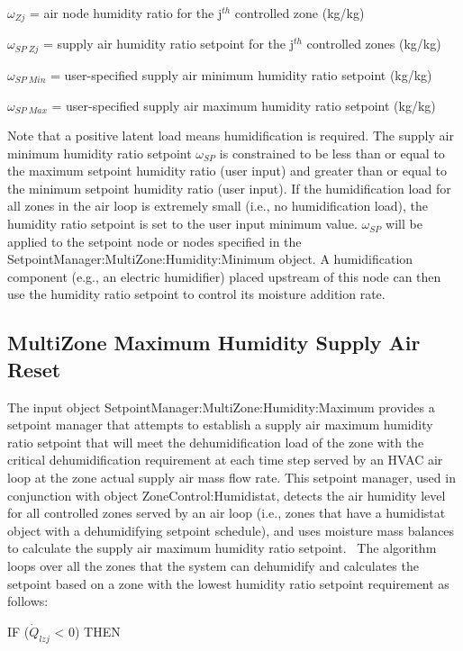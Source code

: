 \({\omega_{Zj}}\) = air node humidity ratio for the j\(^{th}\) controlled zone (kg/kg)

\({\omega_{SP\;Zj}}\) = supply air humidity ratio setpoint for the j\(^{th}\) controlled zones (kg/kg)

\({\omega_{SP\;Min}}\) = user-specified supply air minimum humidity ratio setpoint (kg/kg)

\({\omega_{SP\;Max}}\) = user-specified supply air maximum humidity ratio setpoint (kg/kg)

Note that a positive latent load means humidification is required. The supply air minimum humidity ratio setpoint \({\omega_{SP}}\) is constrained to be less than or equal to the maximum setpoint humidity ratio (user input) and greater than or equal to the minimum setpoint humidity ratio (user input). If the humidification load for all zones in the air loop is extremely small (i.e., no humidification load), the humidity ratio setpoint is set to the user input minimum value. \({\omega_{SP}}\) will be applied to the setpoint node or nodes specified in the SetpointManager:MultiZone:Humidity:Minimum object. A humidification component (e.g., an electric humidifier) placed upstream of this node can then use the humidity ratio setpoint to control its moisture addition rate.

\subsection{MultiZone Maximum Humidity Supply Air Reset}\label{multizone-maximum-humidity-supply-air-reset}

The input object SetpointManager:MultiZone:Humidity:Maximum provides a setpoint manager that attempts to establish a supply air maximum humidity ratio setpoint that will meet the dehumidification load of the zone with the critical dehumidification requirement at each time step served by an HVAC air loop at the zone actual supply air mass flow rate. This setpoint manager, used in conjunction with object ZoneControl:Humidistat, detects the air humidity level for all controlled zones served by an air loop (i.e., zones that have a humidistat object with a dehumidifying setpoint schedule), and uses moisture mass balances to calculate the supply air maximum humidity ratio setpoint.~ The algorithm loops over all the zones that the system can dehumidify and calculates the setpoint based on a zone with the lowest humidity ratio setpoint requirement as follows:

IF (\({\dot Q_{lzj}}\) \textless{} 0) THEN

